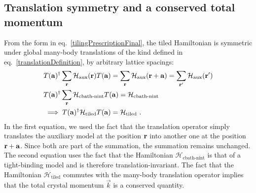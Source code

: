\documentclass[reprint,hidelinks,onecolumn]{revtex4-2}
\begin{document}
\subsection{Translation symmetry and a conserved total momentum}
From the form in eq.~\ref{tilingPrescriptionFinal}, the tiled Hamiltonian is symmetric under global many-body translations of the kind defined in eq.~\ref{translationDefinition}, by arbitrary lattice spacings:
\begin{equation}\begin{aligned}\label{translationSymmetry}
	&T({\bf a})^\dagger\sum_{{\bf r}}\mathcal{H}_\text{aux}({\bf r})T({\bf a}) = \sum_{{\bf r}}\mathcal{H}_\text{aux}({\bf r + a}) = \sum_{{\bf r}^\prime}\mathcal{H}_\text{aux}({\bf r}^\prime)\\
	&T({\bf a})^\dagger\sum_{{\bf r}}\mathcal{H}_\text{cbath-nint}T({\bf a}) = \mathcal{H}_\text{cbath-nint}\\
	&\implies T({\bf a})^\dagger\mathcal{H}_\text{tiled}T({\bf a}) = \mathcal{H}_\text{tiled}~.
\end{aligned}\end{equation}
In the first equation, we used the fact that the translation operator simply translates the auxiliary model at the position \({\bf r}\) into another one at the position \({\bf r} + {\bf a}\). Since both are part of the summation, the summation remains unchanged. The second equation uses the fact that the Hamiltonian \(\mathcal{H}_\text{cbath-nint}\) is that of a tight-binding model and is therefore translation-invariant. The fact that the Hamiltonian \(\mathcal{H}_\text{tiled}\) commutes with the many-body translation operator implies that the total crystal momentum \(\vec k\) is a conserved quantity.
\end{document}
